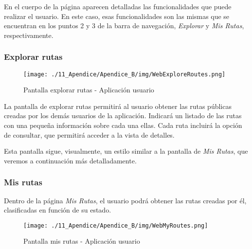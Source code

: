 	
En el cuerpo de la página aparecen detalladas las funcionalidades que puede realizar el usuario. En este caso, esas funcionalidades son las mismas que se encuentran en los puntos 2 y 3 de la barra de navegación, \textit{Explorar} y \textit{Mis Rutas}, respectivamente.


\subsubsection*{Explorar rutas}
\begin{figure}[H]
\centering
\texttt{[image: ./11\_Apendice/Apendice\_B/img/WebExploreRoutes.png]}
\caption{Pantalla explorar rutas - Aplicación usuario}
\end{figure}

La pantalla de explorar rutas permitirá al usuario obtener las rutas públicas creadas por los demás usuarios de la aplicación. Indicará un listado de las rutas con una pequeña información sobre cada una ellas. Cada ruta incluirá la opción de consultar, que permitirá acceder a la vista de detalles. 

Esta pantalla sigue, visualmente, un estilo similar a la pantalla de \textit{Mis Rutas}, que veremos a continuación más detalladamente. 


\subsubsection*{Mis rutas}

Dentro de la página \textit{Mis Rutas}, el usuario podrá obtener las rutas creadas por él, clasificadas en función de su estado.

\begin{figure}[H]
\centering
\texttt{[image: ./11\_Apendice/Apendice\_B/img/WebMyRoutes.png]}
\caption{Pantalla mis rutas - Aplicación usuario}
\end{figure}

